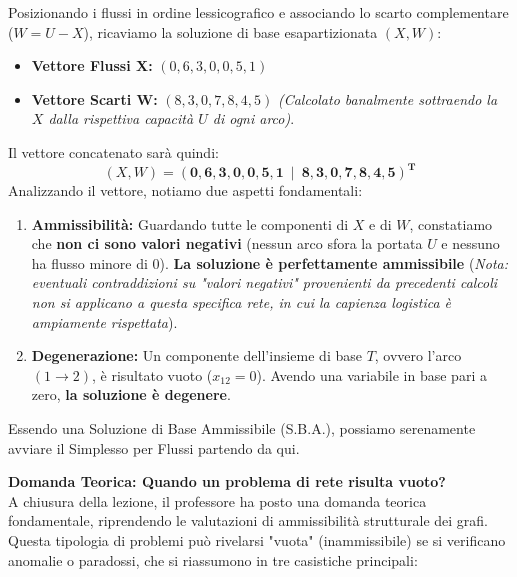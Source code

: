 \documentclass[12pt, a4paper]{article}
\newcommand{\separatore}{\noindent{\color{titlecolor!50}\rule{\textwidth}{0.6pt}}}
\begin{document}
	Posizionando i flussi in ordine lessicografico e associando lo scarto complementare ($W = U - X$), ricaviamo la soluzione di base esapartizionata $(X, W)$:
	\begin{itemize}
		\item \textbf{Vettore Flussi X:} $(0, 6, 3, 0, 0, 5, 1)$
		\item \textbf{Vettore Scarti W:} $(8, 3, 0, 7, 8, 4, 5)$ \textit{(Calcolato banalmente sottraendo la $X$ dalla rispettiva capacità $U$ di ogni arco)}.
	\end{itemize}
	Il vettore concatenato sarà quindi: 
	\[ (X, W) = \mathbf{(0, 6, 3, 0, 0, 5, 1 \ \mid \ 8, 3, 0, 7, 8, 4, 5)^T} \]
	Analizzando il vettore, notiamo due aspetti fondamentali:
	\begin{enumerate}
		\item \textbf{Ammissibilità:} Guardando tutte le componenti di $X$ e di $W$, constatiamo che \textbf{non ci sono valori negativi} (nessun arco sfora la portata $U$ e nessuno ha flusso minore di 0). \textbf{La soluzione è perfettamente ammissibile} (\textit{Nota: eventuali contraddizioni su "valori negativi" provenienti da precedenti calcoli non si applicano a questa specifica rete, in cui la capienza logistica è ampiamente rispettata}).
		\item \textbf{Degenerazione:} Un componente dell'insieme di base $T$, ovvero l'arco $(1\to2)$, è risultato vuoto ($x_{12}=0$). Avendo una variabile in base pari a zero, \textbf{la soluzione è degenere}.
	\end{enumerate}
	Essendo una Soluzione di Base Ammissibile (S.B.A.), possiamo serenamente avviare il Simplesso per Flussi partendo da qui.
	
	\vspace{0.6cm}
	\separatore
	\vspace{0.4cm}
	
	\textbf{Domanda Teorica: Quando un problema di rete risulta vuoto?}\\
	A chiusura della lezione, il professore ha posto una domanda teorica fondamentale, riprendendo le valutazioni di ammissibilità strutturale dei grafi. Questa tipologia di problemi può rivelarsi "vuota" (inammissibile) se si verificano anomalie o paradossi, che si riassumono in tre casistiche principali:
	
\end{document}

